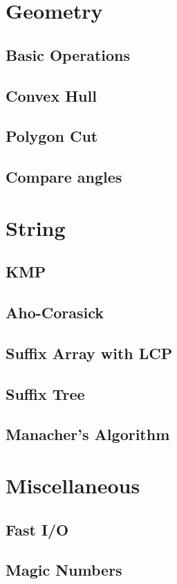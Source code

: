 \documentclass[10pt,landscape,a4paper,twocolumn]{article}
\begin{document}
\section{Geometry}

\subsection{Basic Operations}

\subsection{Convex Hull}

\subsection{Polygon Cut}

\subsection{Compare angles}


\section{String}

\subsection{KMP}

\subsection{Aho-Corasick}


\subsection{Suffix Array with LCP}

\subsection{Suffix Tree}

\subsection{Manacher's Algorithm}


\section{Miscellaneous}

\subsection{Fast I/O}


\subsection{Magic Numbers}
\end{document}
